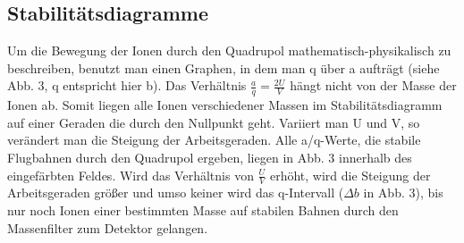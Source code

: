 \subsection{Stabilitätsdiagramme}
Um die Bewegung der Ionen durch den Quadrupol mathematisch-physikalisch zu beschreiben, benutzt man einen Graphen, in dem man q über a aufträgt (siehe Abb. 3, q entspricht hier b). Das Verhältnis $\frac{a}{q}=\frac{2U}{V}$ hängt nicht von der Masse der Ionen ab. Somit liegen alle Ionen verschiedener Massen im Stabilitätsdiagramm auf einer Geraden die durch den Nullpunkt geht. Variiert man U und V, so verändert man die Steigung der Arbeitsgeraden. Alle a/q-Werte, die stabile Flugbahnen durch den Quadrupol ergeben, liegen in Abb. 3 innerhalb des eingefärbten Feldes. Wird das Verhältnis von $\frac{U}{V}$ erhöht, wird die Steigung der Arbeitsgeraden größer und umso keiner wird das q-Intervall ($\Delta b$ in Abb. 3), bis nur noch Ionen einer bestimmten Masse auf stabilen Bahnen durch den Massenfilter zum Detektor gelangen.

\vspace{1cm}

